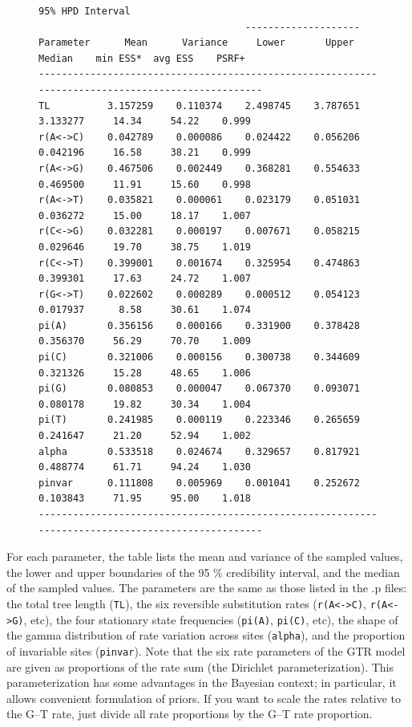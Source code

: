 \documentclass[12pt]{book}
\begin{document}
\begin{figure}[h]
\centering
\begin{BVerbatim}[fontsize=\scriptsize]
                                    95% HPD Interval
                                    --------------------
Parameter      Mean      Variance     Lower       Upper       Median    min ESS*  avg ESS    PSRF+ 
--------------------------------------------------------------------------------------------------
TL          3.157259    0.110374    2.498745    3.787651    3.133277     14.34     54.22    0.999
r(A<->C)    0.042789    0.000086    0.024422    0.056206    0.042196     16.58     38.21    0.999
r(A<->G)    0.467506    0.002449    0.368281    0.554633    0.469500     11.91     15.60    0.998
r(A<->T)    0.035821    0.000061    0.023179    0.051031    0.036272     15.00     18.17    1.007
r(C<->G)    0.032281    0.000197    0.007671    0.058215    0.029646     19.70     38.75    1.019
r(C<->T)    0.399001    0.001674    0.325954    0.474863    0.399301     17.63     24.72    1.007
r(G<->T)    0.022602    0.000289    0.000512    0.054123    0.017937      8.58     30.61    1.074
pi(A)       0.356156    0.000166    0.331900    0.378428    0.356370     56.29     70.70    1.009
pi(C)       0.321006    0.000156    0.300738    0.344609    0.321326     15.28     48.65    1.006
pi(G)       0.080853    0.000047    0.067370    0.093071    0.080178     19.82     30.34    1.004
pi(T)       0.241985    0.000119    0.223346    0.265659    0.241647     21.20     52.94    1.002
alpha       0.533518    0.024674    0.329657    0.817921    0.488774     61.71     94.24    1.030
pinvar      0.111808    0.005969    0.001041    0.252672    0.103843     71.95     95.00    1.018
--------------------------------------------------------------------------------------------------
\end{BVerbatim}
\end{figure}

For each parameter, the table lists the mean and variance of the sampled values, the lower and
upper boundaries of the 95 \% credibility interval, and the median of the sampled values. The
parameters are the same as those listed in the .p files: the total tree length (\texttt{TL}), the
six reversible substitution rates (\texttt{r(A<->C)}, \texttt{r(A<->G)}, etc), the four stationary
state frequencies (\texttt{pi(A)}, \texttt{pi(C)}, etc), the shape of the gamma distribution of
rate variation across sites (\texttt{alpha}), and the proportion of invariable sites
(\texttt{pinvar}). Note that the six rate parameters of the GTR model are given as proportions of
the rate sum (the Dirichlet parameterization). This parameterization has some advantages in the
Bayesian context; in particular, it allows convenient formulation of priors. If you want to scale
the rates relative to the G--T rate, just divide all rate proportions by the G--T rate proportion.
\end{document}
